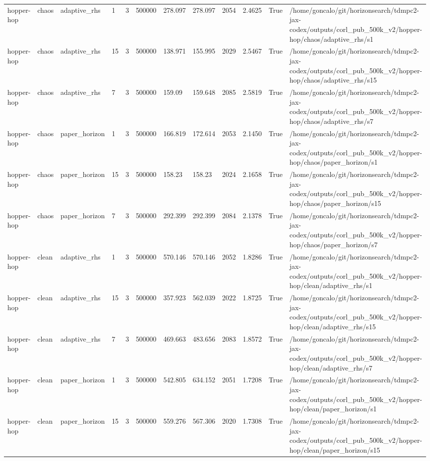 \begin{tabular}{llllllllllll}
hopper-hop & chaos & adaptive\_rhs & 1 & 3 & 500000 & 278.097 & 278.097 & 2054 & 2.4625 & True & /home/goncalo/git/horizonsearch/tdmpc2-jax-codex/outputs/corl\_pub\_500k\_v2/hopper-hop/chaos/adaptive\_rhs/s1 \\
hopper-hop & chaos & adaptive\_rhs & 15 & 3 & 500000 & 138.971 & 155.995 & 2029 & 2.5467 & True & /home/goncalo/git/horizonsearch/tdmpc2-jax-codex/outputs/corl\_pub\_500k\_v2/hopper-hop/chaos/adaptive\_rhs/s15 \\
hopper-hop & chaos & adaptive\_rhs & 7 & 3 & 500000 & 159.09 & 159.648 & 2085 & 2.5819 & True & /home/goncalo/git/horizonsearch/tdmpc2-jax-codex/outputs/corl\_pub\_500k\_v2/hopper-hop/chaos/adaptive\_rhs/s7 \\
hopper-hop & chaos & paper\_horizon & 1 & 3 & 500000 & 166.819 & 172.614 & 2053 & 2.1450 & True & /home/goncalo/git/horizonsearch/tdmpc2-jax-codex/outputs/corl\_pub\_500k\_v2/hopper-hop/chaos/paper\_horizon/s1 \\
hopper-hop & chaos & paper\_horizon & 15 & 3 & 500000 & 158.23 & 158.23 & 2024 & 2.1658 & True & /home/goncalo/git/horizonsearch/tdmpc2-jax-codex/outputs/corl\_pub\_500k\_v2/hopper-hop/chaos/paper\_horizon/s15 \\
hopper-hop & chaos & paper\_horizon & 7 & 3 & 500000 & 292.399 & 292.399 & 2084 & 2.1378 & True & /home/goncalo/git/horizonsearch/tdmpc2-jax-codex/outputs/corl\_pub\_500k\_v2/hopper-hop/chaos/paper\_horizon/s7 \\
hopper-hop & clean & adaptive\_rhs & 1 & 3 & 500000 & 570.146 & 570.146 & 2052 & 1.8286 & True & /home/goncalo/git/horizonsearch/tdmpc2-jax-codex/outputs/corl\_pub\_500k\_v2/hopper-hop/clean/adaptive\_rhs/s1 \\
hopper-hop & clean & adaptive\_rhs & 15 & 3 & 500000 & 357.923 & 562.039 & 2022 & 1.8725 & True & /home/goncalo/git/horizonsearch/tdmpc2-jax-codex/outputs/corl\_pub\_500k\_v2/hopper-hop/clean/adaptive\_rhs/s15 \\
hopper-hop & clean & adaptive\_rhs & 7 & 3 & 500000 & 469.663 & 483.656 & 2083 & 1.8572 & True & /home/goncalo/git/horizonsearch/tdmpc2-jax-codex/outputs/corl\_pub\_500k\_v2/hopper-hop/clean/adaptive\_rhs/s7 \\
hopper-hop & clean & paper\_horizon & 1 & 3 & 500000 & 542.805 & 634.152 & 2051 & 1.7208 & True & /home/goncalo/git/horizonsearch/tdmpc2-jax-codex/outputs/corl\_pub\_500k\_v2/hopper-hop/clean/paper\_horizon/s1 \\
hopper-hop & clean & paper\_horizon & 15 & 3 & 500000 & 559.276 & 567.306 & 2020 & 1.7308 & True & /home/goncalo/git/horizonsearch/tdmpc2-jax-codex/outputs/corl\_pub\_500k\_v2/hopper-hop/clean/paper\_horizon/s15 \\

\end{tabular}
